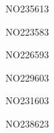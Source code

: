 \documentclass[a4paper,11pt]{report}
\begin{document}
\begin{exol}{NO235}{61}{3}
\end{exol}

\begin{exol}{NO223}{58}{3}
\end{exol}

\begin{exol}{NO226}{59}{3}
\end{exol}

\begin{exol}{NO229}{60}{3}
\end{exol}

\begin{exol}{NO231}{60}{3}
\end{exol}

\begin{exol}{NO238}{62}{3}
\end{exol}
\end{document}
